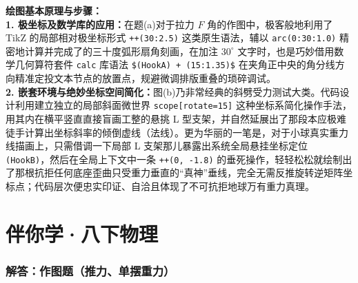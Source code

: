 \vspace{0.6cm}

{\small\color{blue!70!black}
\textbf{绘图基本原理与步骤：}\\
\textbf{1. 极坐标及数学库的应用：}在题(a)对于拉力 $F$ 角的作图中，极客般地利用了 TikZ 的局部相对极坐标形式 \texttt{++(30:2.5)} 这类原生语法，辅以 \texttt{arc(0:30:1.0)} 精密地计算并完成了的三十度弧形扇角刻画，在加注 $30^\circ$ 文字时，也是巧妙借用数学几何算符套件 \texttt{calc} 库语法 \texttt{\$(HookA) + (15:1.35)\$} 在夹角正中央的角分线方向精准定投文本节点的放置点，规避微调排版重叠的琐碎调试。\\
\textbf{2. 嵌套环境与绝妙坐标空间简化：}图(b)乃非常经典的斜劈受力测试大类。代码设计利用建立独立的局部斜面微世界 \texttt{scope[rotate=15]} 这种坐标系简化操作手法，用其内在横平竖直直接盲画工整的悬挑 L 型支架，并自然延展出了那段本应极难徒手计算出坐标斜率的倾倒虚线（法线）。更为华丽的一笔是，对于小球真实重力线描画上，只需借调一下局部 L 支架那儿暴露出系统全局悬挂坐标定位 \texttt{(HookB)}，然后在全局上下文中一条 \texttt{++(0, -1.8)} 的垂死操作，轻轻松松就绘制出了那根抗拒任何底座歪曲只受重力垂直的“真神”垂线，完全无需反推旋转逆矩阵坐标点；代码层次便忠实印证、自洽且体现了不可抗拒地球万有重力真理。
}


\chapter{伴你学·八下物理}


\newpage

\subsection{解答：作图题（推力、单摆重力）}

\vspace{0.6cm}

